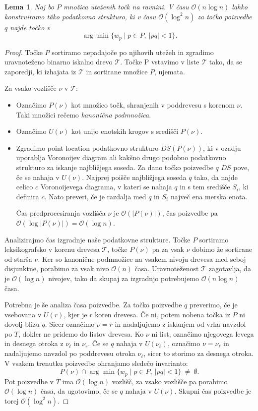 \documentclass[a4paper, 12pt]{book}
\newcommand{\T}{\ensuremath{\mathcal{T}}}
\newcommand{\OO}{\ensuremath{\mathcal{O}}} %
\newtheorem{lema}[izrek]{Lema}
\begin{document}
\begin{lema}
\label{le:ds2}
    Naj bo $P$ množica uteženih točk na ravnini. V času $\OO(n\log n)$ lahko konstruiramo t\^{a}ko podatkovno strukturo, ki v času $\OO(\log^2 n)$ za točko poizvedbe $q$ najde točko v 
	\[	\arg\min \{ w_p \mid p\in P,~|pq|< 1\}.
	\]
\end{lema}
\begin{proof}
Točke $P$ sortiramo nepadajoče po njihovih utežeh in zgradimo uravnoteženo binarno iskalno drevo $\T$. Točke P vstavimo v liste $\T$ tako, da se zaporedji, ki izhajata iz $\T$ in sortirane množice $P$, ujemata.

Za vsako vozlišče $\nu$ v $\T$:
\begin{itemize}
\item Označimo $P(\nu)$ kot množico točk, shranjenih v poddrevesu s korenom $\nu$. Taki množici rečemo \emph{kanonična podmnožica}.
\item Označimo $U(\nu)$ kot unijo enotskih krogov s središči $P(\nu)$.
\item Zgradimo point-location podatkovno strukturo $DS(P(\nu))$, ki v ozadju uporablja Voronoijev diagram ali kakšno drugo podobno podatkovno strukturo za iskanje najbližjega soseda. Za dano točko poizvedbe $q$ $DS$ pove, če se nahaja v $U(\nu)$. Najprej poišče najbližjega soseda $q$ tako, da najde celico $c$ Voronoijevega diagrama, v kateri se nahaja $q$ in s tem središče $S_i$, ki definira $c$. Nato preveri, če je razdalja med $q$ in $S_i$ največ ena merska enota.

Čas predprocesiranja vozlišča $\nu$ je $ \OO(|P(\nu)|)$, čas poizvedbe pa $\OO(\log |P(\nu)|)= \OO(\log n)$.
\end{itemize}

Analizirajmo čas izgradnje naše podatkovne strukture. Točke $P$ sortiramo leksikografsko v korenu drevesa $\T$, točke $P(\nu)$ pa za vsak $\nu$ dobimo že sortirane od starša $\nu$. Ker so kanonične podmnožice na vsakem nivoju drevesa med seboj disjunktne, porabimo za vsak nivo $\OO(n)$ časa. Uravnoteženost $\T$ zagotavlja, da je $\OO(\log n)$ nivojev, tako da skupaj za izgradnjo potrebujemo $\OO(n\log n)$ časa.

Potrebna je še analiza časa poizvedbe. Za točko poizvedbe $q$ preverimo, če je vsebovana v $U(r)$, kjer je $r$ koren drevesa. Če ni, potem nobena točka iz $P$ ni dovolj blizu $q$. Sicer označimo $\nu = r$ in nadaljujemo z iskanjem od vrha navzdol po $T$, dokler ne pridemo do listov drevesa. Ko $\nu$ ni list, označimo njegovega levega in desnega otroka z $\nu_\ell$ in $\nu_r$. Če se $q$ nahaja v $U(\nu_\ell)$, označimo $\nu = \nu_\ell$ in nadaljujemo navzdol po poddrevesu otroka $\nu_\ell$, sicer to storimo za desnega otroka. V vsakem trenutku poizvedbe ohranjamo sledečo invarianto:
\[	P(\nu) \cap \arg\min \{ w_p \mid p\in P,~|pq|< 1\} ~\not=~ \emptyset.
	\]	
Pot poizvedbe v $T$ ima $\OO(\log n)$ vozlišč, za vsako vozlišče pa porabimo $\OO(\log n)$ časa, da ugotovimo, če se $q$ nahaja v $U(\nu)$. Skupni čas poizvedbe je torej $\OO(\log^2 n)$.
\end{proof}
\end{document}
